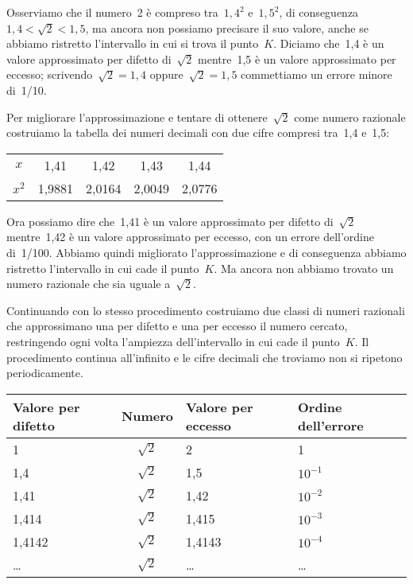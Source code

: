 Osserviamo che il numero~2 è compreso tra~$1,4^{2}$ e~$1,5^{2}$,
di conseguenza~$1,4<\sqrt{2}<1,5$, ma ancora
non possiamo precisare il suo valore, anche se abbiamo ristretto
l'intervallo in cui si trova il punto~$K$. Diciamo che~1,4 è un valore 
approssimato per difetto di~$\sqrt{2}$ mentre~1,5
è un valore approssimato per eccesso; scrivendo~$\sqrt{2}=1,4$
oppure~$\sqrt{2}=1,5$ commettiamo un errore minore di~1/10.

Per migliorare l'approssimazione e tentare di ottenere~$\sqrt{2}$
come numero razionale costruiamo la tabella dei numeri
decimali con due cifre compresi tra~1,4 e~1,5:

\begin{center}
\begin{tabular}{ccccc}
\toprule
$x$ &1,41 &1,42 &1,43 &1,44\\
$x^{2}$ & 1,9881 & 2,0164 & 2,0049 & 2,0776\\
\bottomrule
\end{tabular}
\end{center}

Ora possiamo dire che~1,41 è un valore approssimato per difetto di~$\sqrt{2}$ 
mentre~1,42 è un valore approssimato per eccesso, con un errore 
dell'ordine di~1/100. Abbiamo quindi migliorato l'approssimazione e di 
conseguenza abbiamo ristretto l'intervallo in cui cade il punto~$K$. 
Ma ancora non abbiamo trovato un numero razionale che sia uguale a~$\sqrt{2}$.

Continuando con lo stesso procedimento costruiamo due classi di numeri 
razionali che approssimano una per difetto e una per eccesso il numero 
cercato, restringendo ogni volta l'ampiezza dell'intervallo in cui cade 
il punto~$K$.
Il procedimento continua all'infinito e le cifre decimali che troviamo non 
si ripetono periodicamente.

\begin{center}
 \begin{tabular}{lcll}
\toprule
Valore per difetto & Numero &Valore per eccesso & Ordine dell'errore\\
\midrule
1	& $\sqrt{2}$ 	& 2 	&1\\
1,4	& $\sqrt{2}$	&1,5 	& $10^{-1}$\\
1,41	& $\sqrt{2}$	& 1,42	& $10^{-2}$\\
1,414	& $\sqrt{2}$	&1,415	&$10^{-3}$\\
1,4142	& $\sqrt{2}$	& 1,4143&$10^{-4}$\\
\ldots	& $\sqrt{2}$	&\ldots	&\ldots\\
\bottomrule
\end{tabular}
\end{center}


